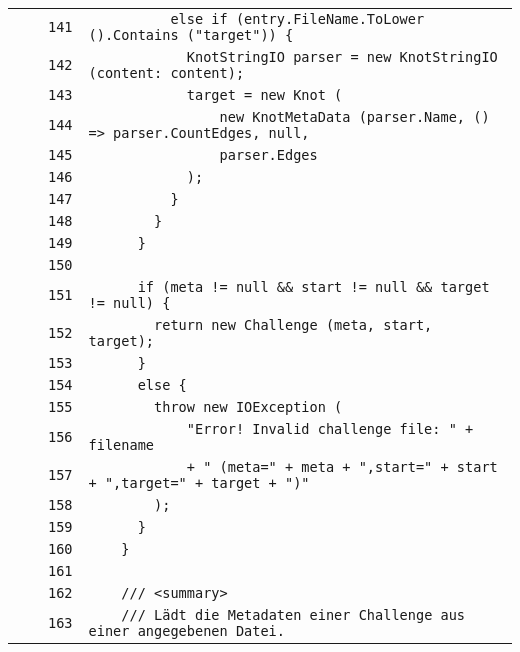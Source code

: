 \documentclass[a4paper,10pt]{article}
\begin{document}
\begin{longtable}[l]{lrrl}
\cellcolor{gray} &  & \verb~141~ & \verb~          else if (entry.FileName.ToLower ().Contains ("target")) {~\\
\cellcolor{gray} &  & \verb~142~ & \verb~            KnotStringIO parser = new KnotStringIO (content: content);~\\
\cellcolor{gray} &  & \verb~143~ & \verb~            target = new Knot (~\\
\cellcolor{gray} &  & \verb~144~ & \verb~                new KnotMetaData (parser.Name, () => parser.CountEdges, null, ~\\
\cellcolor{gray} &  & \verb~145~ & \verb~                parser.Edges~\\
\cellcolor{gray} &  & \verb~146~ & \verb~            );~\\
\cellcolor{gray} &  & \verb~147~ & \verb~          }~\\
\cellcolor{gray} &  & \verb~148~ & \verb~        }~\\
\cellcolor{gray} &  & \verb~149~ & \verb~      }~\\
\cellcolor{gray} &  & \verb~150~ & \verb~~\\
\cellcolor{gray} &  & \verb~151~ & \verb~      if (meta != null && start != null && target != null) {~\\
\cellcolor{gray} &  & \verb~152~ & \verb~        return new Challenge (meta, start, target);~\\
\cellcolor{gray} &  & \verb~153~ & \verb~      }~\\
\cellcolor{gray} &  & \verb~154~ & \verb~      else {~\\
\cellcolor{gray} &  & \verb~155~ & \verb~        throw new IOException (~\\
\cellcolor{gray} &  & \verb~156~ & \verb~            "Error! Invalid challenge file: " + filename~\\
\cellcolor{gray} &  & \verb~157~ & \verb~            + " (meta=" + meta + ",start=" + start + ",target=" + target + ")"~\\
\cellcolor{gray} &  & \verb~158~ & \verb~        );~\\
\cellcolor{gray} &  & \verb~159~ & \verb~      }~\\
\cellcolor{gray} &  & \verb~160~ & \verb~    }~\\
\cellcolor{gray} &  & \verb~161~ & \verb~~\\
\cellcolor{gray} &  & \verb~162~ & \verb~    /// <summary>~\\
\cellcolor{gray} &  & \verb~163~ & \verb~    /// Lädt die Metadaten einer Challenge aus einer angegebenen Datei.~\\

\end{longtable}
\end{document}
